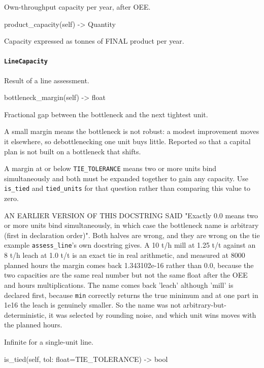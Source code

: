 \documentclass[10pt,a4paper,twoside]{report}
\begin{document}
Own-throughput capacity per year, after OEE.

\begin{verbatimsmall}
product_capacity(self) -> Quantity
\end{verbatimsmall}

Capacity expressed as tonnes of FINAL product per year.

\paragraph{\texttt{LineCapacity}}

Result of a line assessment.

\begin{verbatimsmall}
bottleneck_margin(self) -> float
\end{verbatimsmall}

Fractional gap between the bottleneck and the next tightest unit.

A small margin means the bottleneck is not robust: a modest improvement moves it elsewhere, so debottlenecking one unit buys little. Reported so that a capital plan is not built on a bottleneck that shifts.

A margin at or below \texttt{TIE\_TOLERANCE} means two or more units bind simultaneously and both must be expanded together to gain any capacity. Use \texttt{is\_tied} and \texttt{tied\_units} for that question rather than comparing this value to zero.

AN EARLIER VERSION OF THIS DOCSTRING SAID "Exactly 0.0 means two or more units bind simultaneously, in which case the bottleneck name is arbitrary (first in declaration order)". Both halves are wrong, and they are wrong on the tie example \texttt{assess\_line}'s own docstring gives. A 10 t/h mill at 1.25 t/t against an 8 t/h leach at 1.0 t/t is an exact tie in real arithmetic, and measured at 8000 planned hours the margin comes back 1.343102e-16 rather than 0.0, because the two capacities are the same real number but not the same float after the OEE and hours multiplications. The name comes back 'leach' although 'mill' is declared first, because \texttt{min} correctly returns the true minimum and at one part in 1e16 the leach is genuinely smaller. So the name was not arbitrary-but-deterministic, it was selected by rounding noise, and which unit wins moves with the planned hours.

Infinite for a single-unit line.

\begin{verbatimsmall}
is_tied(self, tol: float=TIE_TOLERANCE) -> bool
\end{verbatimsmall}
\end{document}
